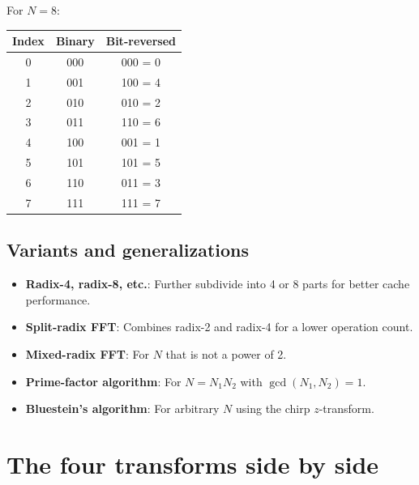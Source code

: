 \begin{notechapter}
\begin{example}
For $N = 8$:
\begin{center}
\begin{tabular}{c|c|c}
Index & Binary & Bit-reversed \\
\hline
0 & 000 & 000 = 0 \\
1 & 001 & 100 = 4 \\
2 & 010 & 010 = 2 \\
3 & 011 & 110 = 6 \\
4 & 100 & 001 = 1 \\
5 & 101 & 101 = 5 \\
6 & 110 & 011 = 3 \\
7 & 111 & 111 = 7 \\
\end{tabular}
\end{center}
\end{example}

\subsection{Variants and generalizations}

\begin{itemize}
\item \textbf{Radix-4, radix-8, etc.}: Further subdivide into 4 or 8 parts for better cache performance.
\item \textbf{Split-radix FFT}: Combines radix-2 and radix-4 for a lower operation count.
\item \textbf{Mixed-radix FFT}: For $N$ that is not a power of 2.
\item \textbf{Prime-factor algorithm}: For $N = N_1 N_2$ with $\gcd(N_1, N_2) = 1$.
\item \textbf{Bluestein's algorithm}: For arbitrary $N$ using the chirp $z$-transform.
\end{itemize}

\section{The four transforms side by side}



\end{notechapter}
